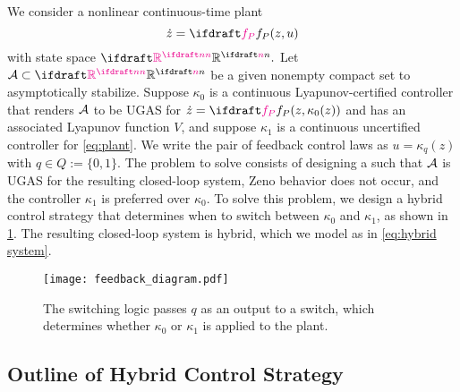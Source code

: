 We consider a nonlinear continuous-time plant 
\begin{equation}
    \dot z = \fp(z,u)
    \label{eq:plant}
\end{equation}
with state space $\plantstatespace.$ 
Let $\calA \subset \plantstatespace$ be a given nonempty
compact set to asymptotically stabilize.
Suppose $\kappa_0$ is a continuous
Lyapunov-certified controller that renders 
${\mathcal{A}}$ to be UGAS for $\dot z =
\fp(z, \kappa_0(z))$ and has an associated Lyapunov function $V$,
and suppose $\kappa_1$ is a 
continuous uncertified controller for \cref{eq:plant}.
We write the pair of feedback control laws as
$u = \kappa_q(z)$ with $q \in Q := \{0, 1\}.$
The problem to solve consists of designing 
a  such 
that ${\mathcal{A}}$ is UGAS for the resulting
closed-loop system, 
Zeno behavior does not occur, 
and the controller $\kappa_1$ is preferred over $\kappa_0.$
To solve this problem, 
we design a hybrid control strategy that determines 
when to switch between $\kappa_0$ and $\kappa_1$, 
as shown in \cref{fig:feedback diagram}.
The resulting closed-loop system is hybrid, which we
model as in \cref{eq:hybrid system}.
\begin{figure}[htbp]
    \centering
    \texttt{[image: feedback\_diagram.pdf]}
    \setlength{\belowcaptionskip}{-8pt}
    \caption{The switching logic passes $q$ as an output to 
    a switch, which determines whether 
    $\kappa_0$ or $\kappa_1$ is applied to the plant.}
    \label{fig:feedback diagram}
\end{figure}

        \subsection{Outline of Hybrid Control Strategy}        
\label{sec:outline of strategy}

